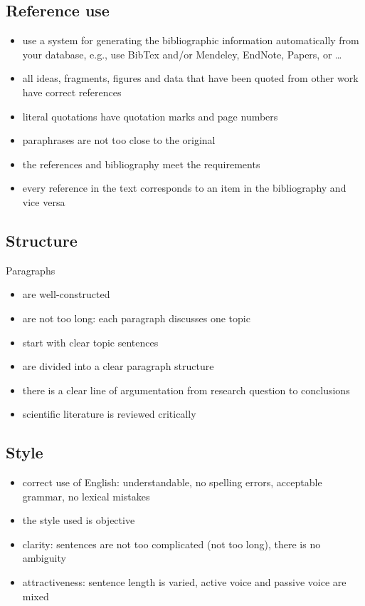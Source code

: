 \documentclass[english]{article}
\begin{document}
\subsection{Reference use}
\begin{itemize}
\item use a system for generating the bibliographic information automatically from your database, e.g., use BibTex and/or Mendeley, EndNote, Papers, or \ldots
\item all ideas, fragments, figures and data that have been quoted from other work have correct references
\item literal quotations have quotation marks and page numbers
\item paraphrases are not too close to the original
\item the references and bibliography meet the requirements
\item every reference in the text corresponds to an item in the bibliography and vice versa
\end{itemize}

\subsection{Structure}
Paragraphs
\begin{itemize}
\item are well-constructed
\item are not too long: each paragraph discusses one topic
\item start with clear topic sentences
\item are divided into a clear paragraph structure
\item there is a clear line of argumentation from research question to conclusions
\item scientific literature is reviewed critically
\end{itemize}

\subsection{Style}
\begin{itemize}
\item correct use of English: understandable, no spelling errors, acceptable grammar, no lexical mistakes 
\item the style used is objective
\item clarity: sentences are not too complicated (not too long), there is no ambiguity
\item attractiveness: sentence length is varied, active voice and passive voice are mixed
\end{itemize}
\end{document}
